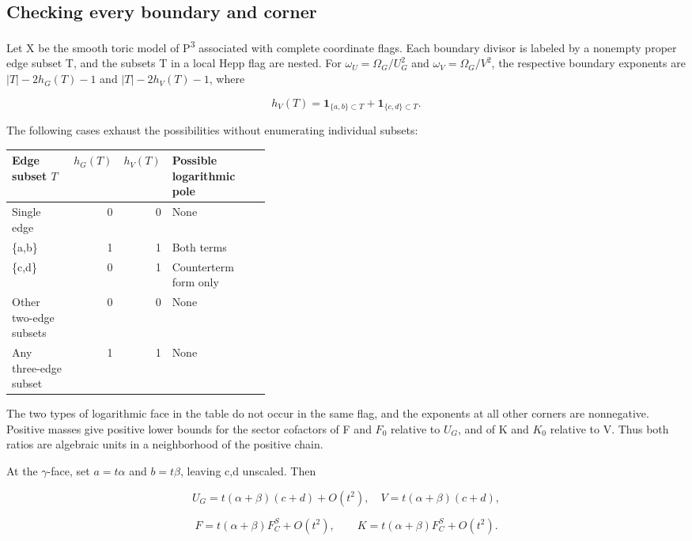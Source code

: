 \documentclass[11pt,a4paper,oneside]{article}
\theoremstyle{plain}
\theoremstyle{definition}
\theoremstyle{remark}
\numberwithin{equation}{section}
\begin{document}
\subsection{Checking every boundary and corner}\label{sec:forest:4}

Let X be the smooth toric model of P\textsuperscript{3} associated with complete coordinate flags. Each boundary divisor is labeled by a nonempty proper edge subset T, and the subsets T in a local Hepp flag are nested. For \(\omega _U=\Omega _G/U_G^{2}\) and \(\omega _V=\Omega _G/V^{2}\), the respective boundary exponents are \(|T|- 2h_G(T)- 1\) and \(|T|- 2h_V(T)- 1\), where

\begin{equation}
h_V(T)=\mathbf1_{\{a,b\}\subset T}+\mathbf1_{\{c,d\}\subset T}.
\end{equation}

The following cases exhaust the possibilities without enumerating individual subsets:

{\def\LTcaptype{none} %
\begin{longtable}[]{@{}lrrp{0.38\linewidth}@{}}
\toprule\noalign{}
Edge subset \(T\) & \(h_G(T)\) & \(h_V(T)\) & Possible logarithmic pole \\
\midrule\noalign{}
\endhead
\bottomrule\noalign{}
\endlastfoot
Single edge & 0 & 0 & None \\
\{a,b\} & 1 & 1 & Both terms \\
\{c,d\} & 0 & 1 & Counterterm form only \\
Other two-edge subsets & 0 & 0 & None \\
Any three-edge subset & 1 & 1 & None \\
\end{longtable}
}

The two types of logarithmic face in the table do not occur in the same flag, and the exponents at all other corners are nonnegative. Positive masses give positive lower bounds for the sector cofactors of F and \(F_0\) relative to \(U_G\), and of K and \(K_0\) relative to V. Thus both ratios are algebraic units in a neighborhood of the positive chain.

At the \(\gamma \)-face, set \(a=t\alpha \) and \(b=t\beta \), leaving c,d unscaled. Then

\begin{equation}
U_G=t(\alpha+\beta)(c+d)+O(t^2),\quad
 V=t(\alpha+\beta)(c+d),
\end{equation}

\begin{equation}
F=t(\alpha+\beta)F_C^S+O(t^2),\qquad
 K=t(\alpha+\beta)F_C^S+O(t^2).                                 \label{eq:forest:15}
\end{equation}
\end{document}
